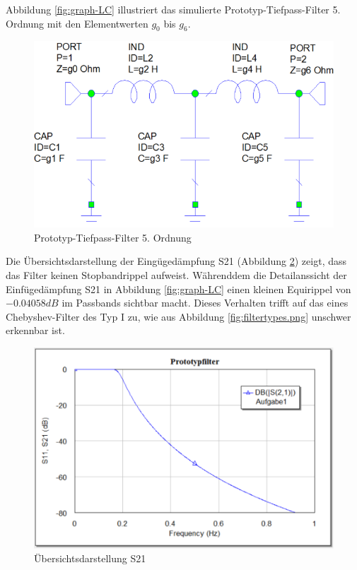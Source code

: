 Abbildung      \ref{fig:graph-LC}       illustriert       das       simulierte
Prototyp-Tiefpass-Filter  5.  Ordnung mit den Elementwerten $g_0$  bis  $g_6$.

\begin{figure}[h!]
\centering
 	\includegraphics[width=\imagewidth]{images/Topologie_Prototyp.png}
 	\caption{Prototyp-Tiefpass-Filter 5. Ordnung}
 	\label{fig:Topologie_Prototyp.png}
\end{figure}

Die    Übersichtsdarstellung     der     Eingügedämpfung     S21    (Abbildung
\ref{fig:Ovw_Prototyp}) zeigt, dass das Filter keinen Stopbandrippel aufweist.
Währenddem  die  Detailanssicht   der   Einfügedämpfung   S21   in   Abbildung
\ref{fig:graph-LC}  einen  kleinen Equirippel von $-0.04058 dB$  im  Passbands
sichtbar macht. Dieses Verhalten trifft auf das eines Chebyshev-Filter des Typ
I  zu,  wie  aus  Abbildung  \ref{fig:filtertypes.png} unschwer erkennbar ist.

\begin{figure}[h!]
    \centering
 	\includegraphics[width=\imagewidth]{images/Ovw_Prototyp.png}
 	\caption{Übersichtsdarstellung S21}
 	\label{fig:Ovw_Prototyp}
\end{figure}

